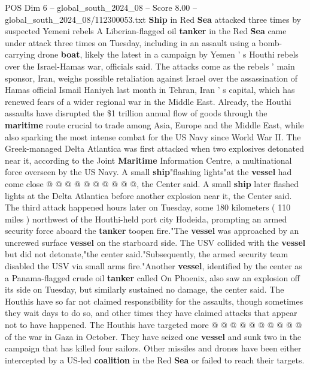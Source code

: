 \begin{textsample}{POS Dim 6 – global\_south\_2024\_08 – Score 8.00 – global\_south\_2024\_08/112300053.txt}  \label{ex:f6_pos_322}
\textbf{Ship} in Red \textbf{Sea} attacked three times by suspected Yemeni rebels A Liberian-flagged oil \textbf{tanker} in the Red \textbf{Sea} came under attack three times on Tuesday, including in an assault using a bomb-carrying drone \textbf{boat}, likely the latest in a campaign by Yemen ' s Houthi rebels over the Israel-Hamas war, officials said.
The attacks come as the rebels ' main sponsor, Iran, weighs possible retaliation against Israel over the assassination of Hamas official Ismail Haniyeh last month in Tehran, Iran ' s capital, which has renewed fears of a wider regional war in the Middle East.
Already, the Houthi assaults have disrupted the \$1 trillion annual flow of goods through the \textbf{maritime} route crucial to trade among Asia, Europe and the Middle East, while also sparking the most intense combat for the US Navy since World War II.
The Greek-managed Delta Atlantica was first attacked when two explosives detonated near it, according to the Joint \textbf{Maritime} Information Centre, a multinational force overseen by the US Navy.
A small \textbf{ship}"flashing lights"at the \textbf{vessel} had come close @ @ @ @ @ @ @ @ @ @, the Center said.
A small \textbf{ship} later flashed lights at the Delta Atlantica before another explosion near it, the Center said.
The third attack happened hours later on Tuesday, some 180 kilometers ( 110 miles ) northwest of the Houthi-held port city Hodeida, prompting an armed security force aboard the \textbf{tanker} toopen fire."The \textbf{vessel} was approached by an uncrewed surface \textbf{vessel} on the starboard side.
The USV collided with the \textbf{vessel} but did not detonate,"the center said."Subsequently, the armed security team disabled the USV via small arms fire."Another \textbf{vessel}, identified by the center as a Panama-flagged crude oil \textbf{tanker} called On Phoenix, also saw an explosion off its side on Tuesday, but similarly sustained no damage, the center said.
The Houthis have so far not claimed responsibility for the assaults, though sometimes they wait days to do so, and other times they have claimed attacks that appear not to have happened.
The Houthis have targeted more @ @ @ @ @ @ @ @ @ @ of the war in Gaza in October.
They have seized one \textbf{vessel} and sunk two in the campaign that has killed four sailors.
Other missiles and drones have been either intercepted by a US-led \textbf{coalition} in the Red \textbf{Sea} or failed to reach their targets.

\end{textsample}
